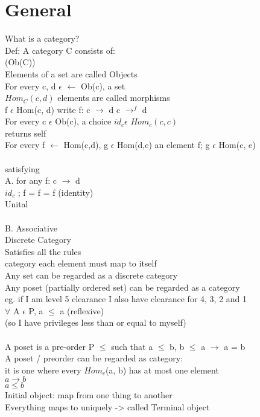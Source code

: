 \documentclass{article}
\begin{document}
\section{General}
What is a category?
\\
Def: A category C consists of: 
\\
(Ob(C))
\\
Elements of a set are called Objects
\\
For every c, d $\epsilon$ $\leftarrow$ Ob(c), a set
\\
$Hom_{C}(c,d)$ elements are called morphisms
\\
f $\epsilon$ Hom(c, d) write f: c $\rightarrow$ d c $\rightarrow^{f}$ d
\\
For every c $\epsilon$ Ob(c), a choice $id_{c} \epsilon$ $Hom_{c}(c, c)$
\\
returns self
\\
For every f $\leftarrow$ Hom(c,d), g $\epsilon$ Hom(d,e)
an element f; g $\epsilon$ Hom(c, e)
\\
\\
satisfying
\\
A. for any f: c $\rightarrow$ d 
\\
$id_{c}$ ; f = f = f (identity)
\\
Unital
\\
\\
B. Associative 
\\
Discrete Category
\\
Satisfies all the rules 
\\
category each element must map to itself
\\
Any set can be regarded as a discrete category
\\
Any poset (partially ordered set) can be regarded as a category
\\
eg. if I am level 5 clearance I also have clearance for 4, 3, 2 and 1
\\
$\forall$ A $\epsilon$ P, a $\leq$ a (reflexive)
\\
(so I have privileges less than or equal to myself)
\\
\\
A poset is a pre-order P $\leq$ such that a $\leq$ b, b $\leq$ a $\rightarrow$ a = b
\\
A poset / preorder can be regarded as category:
\\
it is one where every $Hom_{c}$(a, b) has at most one element
\\
$a \rightarrow b$
\\
$a \leq b$
\\
Initial object: map from one thing to another
\\
Everything maps to uniquely -> called Terminal object
\\
\end{document}
